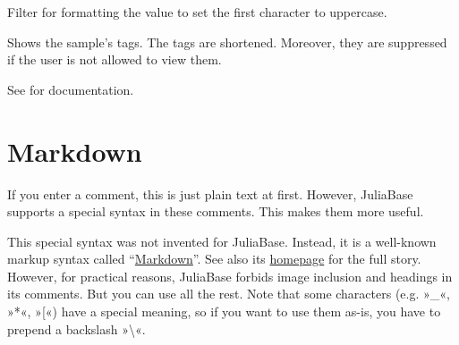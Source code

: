 \documentclass[a4paper,11pt,english]{sphinxmanual}
\begin{document}

\begin{fulllineitems}
\label{programming/template_tags_and_filters:samples.templatetags.samples_extras.first_upper}
Filter for formatting the value to set the first character to uppercase.

\end{fulllineitems}


\begin{fulllineitems}
\label{programming/template_tags_and_filters:samples.templatetags.samples_extras.sample_tags}
Shows the sample's tags.  The tags are shortened.  Moreover, they are
suppressed if the user is not allowed to view them.

\end{fulllineitems}


\begin{fulllineitems}
\label{programming/template_tags_and_filters:samples.templatetags.samples_extras.camel_case_to_human_text}
See {\hyperref[programming/utilities:jb_common.utils.base.camel_case_to_human_text]{}} for documentation.

\end{fulllineitems}



\chapter{Markdown}
\label{markdown:index-0}\label{markdown:markdown}\label{markdown::doc}
If you enter a comment, this is just plain text at first.  However, JuliaBase
supports a special syntax in these comments.  This makes them more useful.

This special syntax was not invented for JuliaBase.  Instead, it is a well-known
markup syntax called “\href{http://en.wikipedia.org/wiki/markdown}{Markdown}”.
See also its \href{http://daringfireball.net/projects/markdown/basics}{homepage}
for the full story.  However, for practical reasons, JuliaBase forbids image
inclusion and headings in its comments.  But you can use all the rest.  Note
that some characters (e.g. »\_«, »*«, »{[}«) have a special meaning, so if you
want to use them as-is, you have to prepend a backslash »\textbackslash{}«.
\end{document}
